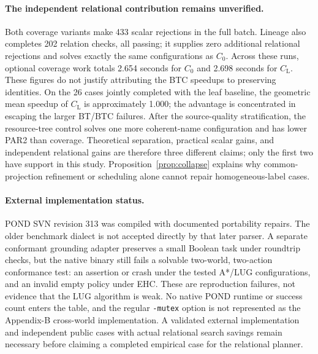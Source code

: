 \documentclass[11pt]{article}
\theoremstyle{definition}
\newcommand{\CL}{C_{\mathrm L}}
\begin{document}
\paragraph{The independent relational contribution remains unverified.}
Both coverage variants make 433 scalar rejections in the full batch. Lineage
also completes 202 relation checks, all passing; it supplies zero additional
relational rejections and solves exactly the same configurations as $C_0$.
Across these runs, optional coverage work totals 2.654 seconds for $C_0$ and
2.698 seconds for $\CL$. These figures do not justify attributing the BTC
speedups to preserving identities. On the 26 cases jointly completed with the
leaf baseline, the geometric mean speedup of $\CL$ is approximately 1.000;
the advantage is concentrated in escaping the larger BT/BTC failures.
After the source-quality stratification, the resource-tree control solves one
more coherent-name configuration and has lower PAR2 than coverage.
Theoretical separation, practical scalar gains, and independent relational
gains are therefore three different claims; only the first two have support
in this study. Proposition~\ref{prop:collapse} explains why common-projection
refinement or scheduling alone cannot repair homogeneous-label cases.

\paragraph{External implementation status.}
POND SVN revision 313 was compiled with documented portability repairs.
The older benchmark dialect is not accepted directly by that later parser.
A separate conformant grounding adapter preserves a small Boolean task under
roundtrip checks, but the native binary still fails a solvable two-world,
two-action conformance test: an assertion or crash under the tested A*/LUG
configurations, and an invalid empty policy under EHC. These are reproduction
failures, not evidence that the LUG algorithm is weak. No native POND runtime
or success count enters the table, and the regular \texttt{-mutex} option is
not represented as the Appendix-B cross-world implementation. A validated
external implementation and independent public cases with actual relational
search savings remain necessary before claiming a completed empirical case
for the relational planner.
\end{document}
